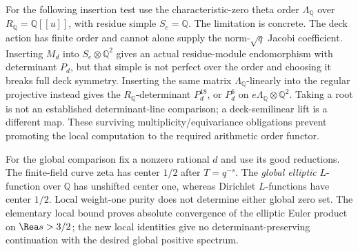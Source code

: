 \documentclass[11pt]{article}
\theoremstyle{definition}\newtheorem{definition}[theorem]{Definition}
\theoremstyle{remark}\newtheorem{remark}[theorem]{Remark}
\begin{document}
For the following insertion test use the characteristic-zero theta order $\Lambda_{\mathbb{Q}}$ over $R_{\mathbb{Q}}=\mathbb{Q}[[u]]$, with residue simple $S_e=\mathbb{Q}$. The limitation is concrete. The deck action has finite order and cannot alone supply the norm-$\sqrt q$ Jacobi coefficient. Inserting $M_d$ into $S_e\otimes\mathbb{Q}^2$ gives an actual residue-module endomorphism with determinant $P_d$, but that simple is not perfect over the order and choosing it breaks full deck symmetry. Inserting the same matrix $\Lambda_{\mathbb{Q}}$-linearly into the regular projective instead gives the $R_{\mathbb{Q}}$-determinant $P_d^{18}$, or $P_d^6$ on $e\Lambda_{\mathbb{Q}}\otimes\mathbb{Q}^2$. Taking a root is not an established determinant-line comparison; a deck-semilinear lift is a different map. These surviving multiplicity/equivariance obligations prevent promoting the local computation to the required arithmetic order functor.

For the global comparison fix a nonzero rational $d$ and use its good reductions. The finite-field curve zeta has center $1/2$ after $T=q^{-s}$. The \emph{global elliptic} $L$-function over $\mathbb{Q}$ has unshifted center one, whereas Dirichlet $L$-functions have center $1/2$. Local weight-one purity does not determine either global zero set. The elementary local bound proves absolute convergence of the elliptic Euler product on $\Rea s>3/2$; the new local identities give no determinant-preserving continuation with the desired global positive spectrum.
\end{document}
